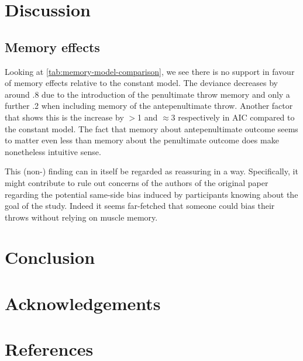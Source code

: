 \documentclass[a4paper, 12pt,oneside]{article}
\begin{document}
	\section{Discussion}


	\subsection{Memory effects}
	Looking at \ref{tab:memory-model-comparison}, we see there is no support in favour of memory effects relative to the constant model. The deviance decreases by around .8 due to the introduction of the penultimate throw memory and only a further .2 when including memory of the antepenultimate throw. Another factor that shows this is the increase by $>$1 and $\approx 3$ respectively in AIC compared to the constant model.
	The fact that memory about antepenultimate outcome seems to matter even less than memory about the penultimate outcome does make nonetheless intuitive sense. 

	This (non-) finding can in itself be regarded as reassuring in a way. Specifically, it might contribute to rule out concerns of the authors of the original paper regarding the potential same-side bias induced by participants knowing about the goal of the study. Indeed it seems far-fetched that someone could bias their throws without relying on muscle memory. 
	\section{Conclusion}
	\section*{Acknowledgements}
	\section*{References}
\end{document}
